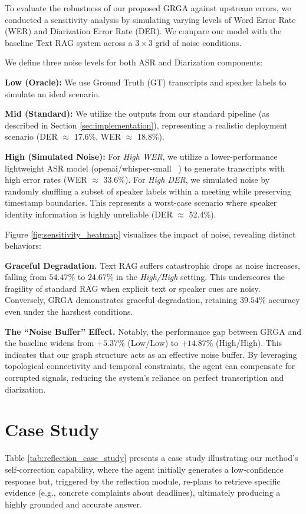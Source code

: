 \documentclass[11pt]{article}
\begin{document}
To evaluate the robustness of our proposed GRGA against upstream errors, we conducted a sensitivity analysis by simulating varying levels of Word Error Rate (WER) and Diarization Error Rate (DER). 
We compare our model with the baseline Text RAG system across a $3 \times 3$ grid of noise conditions.

We define three noise levels for both ASR and Diarization components:

\textbf{Low (Oracle):} We use Ground Truth (GT) transcripts and speaker labels to simulate an ideal scenario.

\textbf{Mid (Standard):} We utilize the outputs from our standard pipeline (as described in Section \ref{sec:implementation}), representing a realistic deployment scenario (DER $\approx$ 17.6\%, WER $\approx$ 18.8\%).

\textbf{High (Simulated Noise):} 
For \textit{High WER}, we utilize a lower-performance lightweight ASR model (openai/whisper-small ~\cite{whisper}) to generate transcripts with high error rates (WER $\approx$ 33.6\%).
For \textit{High DER}, we simulated noise by randomly shuffling a subset of speaker labels within a meeting while preserving timestamp boundaries. This represents a worst-case scenario where speaker identity information is highly unreliable (DER $\approx$ 52.4\%). 

Figure \ref{fig:sensitivity_heatmap} visualizes the impact of noise, revealing distinct behaviors:

\textbf{Graceful Degradation.}
Text RAG suffers catastrophic drops as noise increases, falling from $54.47\%$ to $24.67\%$ in the \textit{High/High} setting. This underscores the fragility of standard RAG when explicit text or speaker cues are noisy. Conversely, GRGA demonstrates graceful degradation, retaining $39.54\%$ accuracy even under the harshest conditions.

\textbf{The ``Noise Buffer'' Effect.}
Notably, the performance gap between GRGA and the baseline widens from $+5.37\%$ (Low/Low) to $+14.87\%$ (High/High). This indicates that our graph structure acts as an effective noise buffer. By leveraging topological connectivity and temporal constraints, the agent can compensate for corrupted signals, reducing the system's reliance on perfect transcription and diarization.

\section{Case Study}
Table \ref{tab:reflection_case_study} presents a case study illustrating our method's self-correction capability, where the agent initially generates a low-confidence response but, triggered by the reflection module, re-plans to retrieve specific evidence (e.g., concrete complaints about deadlines), ultimately producing a highly grounded and accurate answer.
\end{document}
